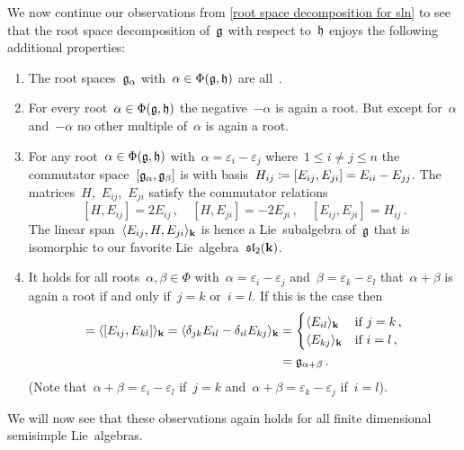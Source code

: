 \begin{example}
  We now continue our observations from \cref{root space decomposition for sln} to see that the root space decomposition of~$\mathfrak{g}$ with respect to~$\mathfrak{h}$ enjoys the following additional properties:
  \begin{enumerate}
    \item
      The root spaces~$\mathfrak{g}_\alpha$ with~$\alpha \in \Phi(\mathfrak{g}, \mathfrak{h})$ are all~{\onedimensional}.
    \item
      For every root~$\alpha \in \Phi(\mathfrak{g}, \mathfrak{h})$ the negative~$-\alpha$ is again a root.
      But except for~$\alpha$ and~$-\alpha$ no other multiple of~$\alpha$ is again a root.
    \item
      For any root~$\alpha \in \Phi(\mathfrak{g}, \mathfrak{h})$ with~$\alpha = \varepsilon_i - \varepsilon_j$ where~$1 \leq i \neq j \leq n$ the commutator space~$[\mathfrak{g}_\alpha, \mathfrak{g}_\beta]$ is {\onedimensional} with basis~$H_{ij} \coloneqq [E_{ij}, E_{ji}] = E_{ii} - E_{jj}$.
      The matrices~$H$,~$E_{ij}$,~$E_{ji}$ satisfy the commutator relations
      \[
        [H, E_{ij}]       = 2 E_{ij}  \,,
        \quad
        [H, E_{ji}]       = -2 E_{ji} \,,
        \quad
        [E_{ij}, E_{ji}]  = H_{ij}    \,.
      \]
      The linear span~$\langle E_{ij}, H, E_{ji}\rangle_{\mathbf{k}}$ is hence a Lie~subalgebra of~$\mathfrak{g}$ that is isomorphic to our favorite Lie~algebra~$\mathfrak{sl}_2(\mathbf{k})$.
    \item
      It holds for all roots~$\alpha, \beta \in \Phi$ with~$\alpha = \varepsilon_i - \varepsilon_j$ and~$\beta = \varepsilon_k - \varepsilon_l$ that~$\alpha + \beta$ is again a root if and only if~$j = k$ or~$i = l$.
      If this is the case then
      \begin{align*}
        [\glie_\alpha, \glie_\beta]
        =
        \gen{ [E_{ij}, E_{kl}] }_{\kf}
        =
        \gen{\delta_{jk} E_{il} - \delta_{il} E_{kj}}_{\kf}
        &=
        \begin{cases}
          \gen{ E_{il} }_{\kf}  & \text{if~$j=k$} \,, \\
          \gen{ E_{kj} }_{\kf}  & \text{if~$i=l$} \,,
        \end{cases}
        \\
        &=
        \glie_{\alpha + \beta}  \,.
      \end{align*}
      (Note that~$\alpha + \beta = \varepsilon_i - \varepsilon_l$ if~$j = k$ and~$\alpha + \beta = \varepsilon_k - \varepsilon_j$ if~$i=l$).
  \end{enumerate}
  We will now see that these observations again holds for all finite dimensional semisimple Lie~algebras.
\end{example}


